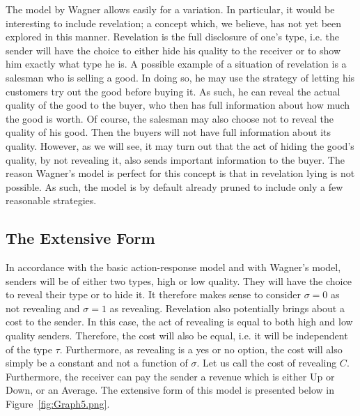\documentclass[a4paper,10pt]{article}
\numberwithin{equation}{section}
\begin{document}
The model by Wagner allows easily for a variation. In particular, it would be interesting to include revelation; a concept which, we believe, has not yet been explored in this manner. Revelation is the full disclosure of one's type, i.e. the sender will have the choice to either hide his quality to the receiver or to show him exactly what type he is. A possible example of a situation of revelation is a salesman who is selling a good. In doing so, he may use the strategy of letting his customers try out the good before buying it. As such, he can reveal the actual quality of the good to the buyer, who then has full information about how much the good is worth. Of course, the salesman may also choose not to reveal the quality of his good. Then the buyers will not have full information about its quality. However, as we will see, it may turn out that the act of hiding the good's quality, by not revealing it, also sends important information to the buyer. The reason Wagner's model is perfect for this concept is that in revelation lying is not possible. As such, the model is by default already pruned to include only a few reasonable strategies.

\subsection{The Extensive Form}
\label{sec:The Extensive Form}

In accordance with the basic action-response model and with Wagner's model, senders will be of either two types, high or low quality. They will have the choice to reveal their type or to hide it. It therefore makes sense to consider $\sigma=0$ as not revealing and $\sigma=1$ as revealing. Revelation also potentially brings about a cost to the sender. In this case, the act of revealing is equal to both high and low quality senders. Therefore, the cost will also be equal, i.e. it will be independent of the type $\tau$. Furthermore, as revealing is a yes or no option, the cost will also simply be a constant and not a function of $\sigma$. Let us call the cost of revealing $C$. Furthermore, the receiver can pay the sender a revenue which is either Up or Down, or an Average. The extensive form of this model is presented below in Figure~\ref{fig:Graph5.png}.
\end{document}
